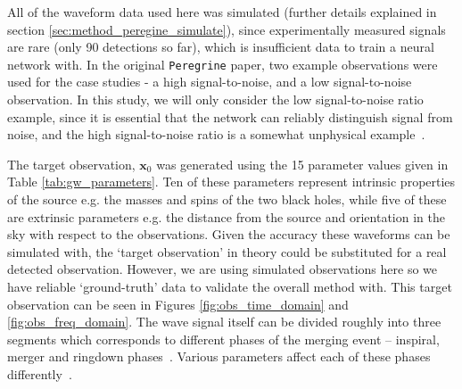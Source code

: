 All of the waveform data used here was simulated (further details explained in section \ref{sec:method_peregine_simulate}), since experimentally measured signals are rare (only 90 detections so far), which is insufficient data to train a neural network with. In the original \texttt{Peregrine} paper, two example observations were used for the case studies - a high signal-to-noise, and a low signal-to-noise observation. In this study, we will only consider the low signal-to-noise ratio example, since it is essential that the network can reliably distinguish signal from noise, and the high signal-to-noise ratio is a somewhat unphysical example~\cite{bhardwaj2023peregrine}.

The target observation, $\boldsymbol{x}_0$ was generated using the 15 parameter values given in Table \ref{tab:gw_parameters}. Ten of these parameters represent intrinsic properties of the source e.g. the masses and spins of the two black holes, while five of these are extrinsic parameters e.g. the distance from the source and orientation in the sky with respect to the observations. Given the accuracy these waveforms can be simulated with, the `target observation' in theory could be substituted for a real detected observation. However, we are using simulated observations here so we have reliable `ground-truth' data to validate the overall method with. This target observation can be seen in Figures \ref{fig:obs_time_domain} and \ref{fig:obs_freq_domain}. The wave signal itself can be divided roughly into three segments which corresponds to different phases of the merging event -- inspiral, merger and ringdown phases~\cite{Pan_GW_2014}. Various parameters affect each of these phases differently~\cite{bhardwaj2023peregrine}.


